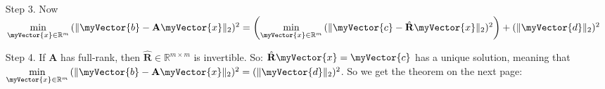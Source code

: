 \documentclass{book}
\newenvironment{myIndent}{%
   \begin{adjustwidth}{2.5em}{0em}%
}{%
   \end{adjustwidth}%
}
\newenvironment{myDindent}{%
   \begin{adjustwidth}{5.0em}{0em}%
}{%
   \end{adjustwidth}%
}
\newcommand{\retTwo}{\hfill\bigbreak}
\newcommand{\mVec}[1]{\myVector{#1}}
\newcommand{\mMat}[1]{\mathbf{#1}}
\begin{document}
\begin{itemize}
{\begin{myIndent}
\begin{itemize}
{\begin{myDindent}
               \begin{myDindent}
                  \dots where $\mVec{c}, \hat{\mMat{R}}\mVec{x} \in \mathbb{R}^m$ and $\mVec{d} \in \mathbb{R}^{n-m}$  \retTwo
               \end{myDindent}
            \end{myDindent}}
            $(\|\mMat{Q}^T\mVec{b} - \mMat{R}\mVec{x}\|_2)^2 = \left(\left\|
            \begin{bmatrix}
               \mVec{c} \\ \mVec{d}
            \end{bmatrix} - 
            \begin{bmatrix}
               \hat{\mMat{R}}\mVec{x} \\ \mVec{0}
            \end{bmatrix}\right\|_2\right)^2 = \left\| 
            \begin{bmatrix}
               \mVec{c} - \hat{\mMat{R}}\mVec{x} \\ \mVec{d}
            \end{bmatrix}\right\|_2^{\phantom{2}2}$\newline
            
            $\hphantom{(\|\mMat{Q}^T\mVec{b} - \mMat{R}\mVec{x}\|_2)^2 = \left(\left\|
               \begin{bmatrix}
                  \mVec{c} \\ \mVec{d}
               \end{bmatrix} - 
               \begin{bmatrix}
                  \hat{\mMat{R}}\mVec{x} \\ \mVec{0}
               \end{bmatrix}\right\|_2\right)^2}
            = (\|\mVec{c} - \hat{\mMat{R}}\mVec{x}\|_2)^2 + (\|\mVec{d}\|_2)^2$ \retTwo
            
            \item[{\color{BrickRed}Step 3.}] Now $\min\limits_{\mVec{x} \in \mathbb{R}^m}{(\|\mVec{b} - \mMat{A}\mVec{x}\|_2)^2} = \left(\min\limits_{\mVec{x} \in \mathbb{R}^m}{(\|\mVec{c} - \hat{\mMat{R}}\mVec{x}\|_2)^2}\right) + (\|\mVec{d}\|_2)^2$ \retTwo
            
            \item[{\color{BrickRed}Step 4.}] If $\mMat{A}$ has full-rank, then $\hat{\mMat{R}} \in \mathbb{R}^{m\times m}$ is invertible. So: $\hat{\mMat{R}}\mVec{x} = \mVec{c}$ has a unique solution, meaning that $\min\limits_{\mVec{x} \in \mathbb{R}^m}{(\|\mVec{b} - \mMat{A}\mVec{x}\|_2)^2} = (\|\mVec{d}\|_2)^2$. So we get the theorem on the next page:
         \end{itemize}


\end{myIndent}}
\end{itemize}
\end{document}
